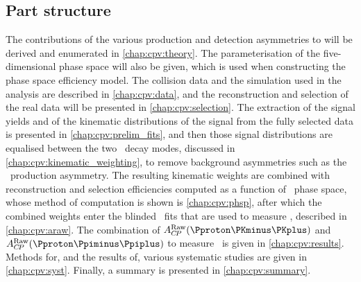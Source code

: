 \subsection{Part structure}
\label{chap:cpv:introduction:overview:structure}

The contributions of the various production and detection asymmetries to \ARaw
will be derived and enumerated in \cref{chap:cpv:theory}.
The parameterisation of the five-dimensional phase space will also be given,
which is used when constructing the phase space efficiency model.
The collision data and the simulation used in the analysis are described in
\cref{chap:cpv:data}, and the reconstruction and selection of the real data
will be presented in \cref{chap:cpv:selection}.
The extraction of the signal yields and of the kinematic distributions of the
signal from the fully selected data is presented in
\cref{chap:cpv:prelim_fits}, and then those signal distributions are equalised
between the two \PLambdac\ decay modes, discussed in
\cref{chap:cpv:kinematic_weighting}, to remove background asymmetries such as 
the \PLambdab\ production asymmetry.
The resulting kinematic weights are combined with reconstruction and selection
efficiencies computed as a function of \phh\ phase space, whose method of
computation is shown is \cref{chap:cpv:phsp}, after which the combined weights
enter the blinded \chisq\ fits that are used to measure \ARaw, described in
\cref{chap:cpv:araw}.
The combination of $\ARaw(\pKK)$ and $\ARaw(\ppipi)$ to measure \dACP\ is given
in \cref{chap:cpv:results}.
Methods for, and the results of, various systematic studies are given in
\cref{chap:cpv:syst}.
Finally, a summary is presented in \cref{chap:cpv:summary}.
